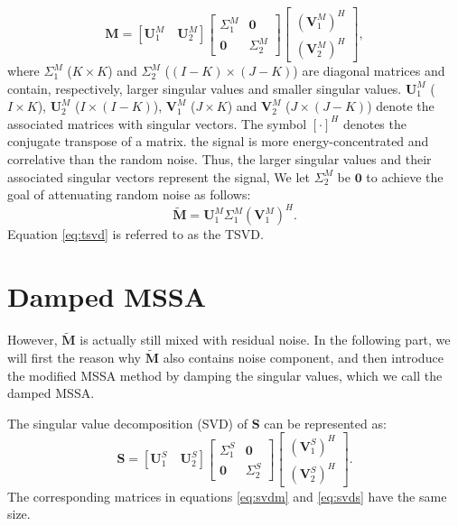 \begin{equation}
\label{eq:svdm}
\mathbf{M} = [\mathbf{U}_1^M\quad \mathbf{U}_2^M]\left[\begin{array}{cc} 
\Sigma_1^M & \mathbf{0}\\
\mathbf{0} & \Sigma_2^M
\end{array}
\right]\left[\begin{array}{c} 
(\mathbf{V}_1^M)^H\\
(\mathbf{V}_2^M)^H
\end{array}
\right],
\end{equation}
where $\Sigma_1^M$ ($K\times K$) and $\Sigma_2^M$ ($(I-K)\times(J-K)$) are diagonal matrices and contain, respectively, larger singular values and smaller singular values. $\mathbf{U}_1^M$ ($I\times K$), $\mathbf{U}_2^M$ ($I\times (I-K)$), $\mathbf{V}_1^M$ ($J\times K$) and $\mathbf{V}_2^M$ ($J\times (J-K)$) denote the associated matrices with singular vectors. The symbol $[\cdot]^H$ denotes the conjugate transpose of a matrix.  the signal is more energy-concentrated and correlative than the random noise.  Thus, the larger singular values and their associated singular vectors represent the signal,  We let $\Sigma_2^M$ be $\mathbf{0}$ to achieve the goal of attenuating random noise as follows:
\begin{equation}
\label{eq:tsvd}
\tilde{\mathbf{M}} = \mathbf{U}_1^M\Sigma_1^M(\mathbf{V}_1^M)^H.
\end{equation}
Equation \ref{eq:tsvd} is referred to as the TSVD.

\section{Damped MSSA}
However, $\tilde{\mathbf{M}}$ is actually still mixed with residual noise. In the following part, we will first  the reason why $\tilde{\mathbf{M}}$ also contains noise component, and then introduce the modified MSSA method by damping the singular values, which we call the damped MSSA. 

The singular value decomposition (SVD) of $\mathbf{S}$ can be represented as:
\begin{equation}
\label{eq:svds}
\mathbf{S} = [\mathbf{U}_1^S\quad \mathbf{U}_2^S]\left[\begin{array}{cc} 
\Sigma_1^S & \mathbf{0}\\
\mathbf{0} & \Sigma_2^S
\end{array}
\right]\left[\begin{array}{c} 
(\mathbf{V}_1^S)^H\\
(\mathbf{V}_2^S)^H
\end{array}
\right].
\end{equation}
The corresponding matrices in equations \ref{eq:svdm} and \ref{eq:svds} have the same size. 

